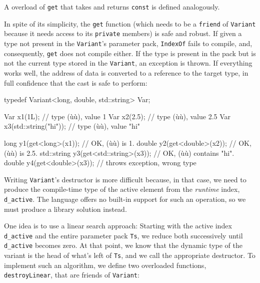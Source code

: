 \noindent A overload of \lstinline!get! that takes and returns \lstinline!const! is
defined analogously.

In spite of its simplicity, the \lstinline!get! function (which needs to be
a \lstinline!friend! of \lstinline!Variant! because it needs access to its
\lstinline!private! members) is safe and robust. If given a type not
present in the \lstinline!Variant!'s parameter pack, \lstinline!IndexOf! fails
to compile, and, consequently, \lstinline!get! does not compile either. If
the type is present in the pack but is not the current type stored in
the \lstinline!Variant!, an exception is thrown. If everything works well,
the address of data is converted to a reference to the target type, in
full confidence that the cast is safe to perform:

\begin{emcppslisting}
typedef Variant<long, double, std::string> Var;

Var x1(1L);                            // type (ù{}ù), value 1
Var x2(2.5);                           // type (ù{}ù), value 2.5
Var x3(std::string("hi"));             // type (ù{}ù), value "hi"

long y1(get<long>(x1));                // OK, (ù{}ù) is 1.
double y2(get<double>(x2));            // OK, (ù{}ù) is 2.5.
std::string y3(get<std::string>(x3));  // OK, (ù{}ù) contains "hi".
double y4(get<double>(x3));            // throws exception, wrong type
\end{emcppslisting}
    

\noindent Writing \lstinline!Variant!'s destructor is more difficult because, in that
case, we need to produce the compile-time type of the active element
from the \emph{runtime} index, \lstinline!d_active!. The language offers
no built-in support for such an operation, so we must produce a library
solution instead.

One idea is to use a linear search approach: Starting with the active
index \lstinline!d_active! and the entire parameter pack \lstinline!Ts!, we
reduce both successively until \lstinline!d_active! becomes zero. At that
point, we know that the dynamic type of the variant is the head of
what's left of \lstinline!Ts!, and we call the appropriate destructor. To
implement such an algorithm, we define two overloaded functions,
\lstinline!destroyLinear!, that are friends of \lstinline!Variant!:

